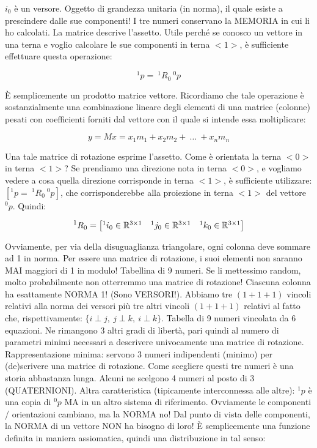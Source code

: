 $i_0$ è un versore. Oggetto di grandezza unitaria (in norma), il quale esiste a prescindere dalle sue componenti! I tre numeri conservano la MEMORIA in cui li ho calcolati. La matrice descrive l'assetto. Utile perché se conosco un vettore in una terna e voglio calcolare le sue componenti in terna $<1>$, è sufficiente effettuare questa operazione:

\[
	^1p =\ ^1R_0\ ^0p
\]

\`E semplicemente un prodotto matrice vettore. Ricordiamo che tale operazione è sostanzialmente una combinazione lineare degli elementi di una matrice (colonne) pesati con coefficienti forniti dal vettore con il quale si intende essa moltiplicare:

\[
	y = Mx = x_1m_1 + x_2m_2 +\ \dots\ + x_nm_n
\]

Una tale matrice di rotazione esprime l'assetto. Come è orientata la terna $<0>$ in terna $<1>$? Se prendiamo una direzione nota in terna $<0>$, e vogliamo vedere a cosa quella direzione corrisponde in terna $<1>$, è sufficiente utilizzare: $[^1p =\ ^1R_0\ ^0p]$, che corrisponderebbe alla proiezione in terna $<1>$ del vettore $^0p$. Quindi:

\[
	^1R_0 =
	\begin{bmatrix}{^1}i_0\in\mathbb{R}^{3\times 1}&^1j_0\in\mathbb{R}^{3\times 1}&^1k_0\in\mathbb{R}^{3\times 1}\end{bmatrix}
\]

Ovviamente, per via della disuguaglianza triangolare, ogni colonna deve sommare ad 1 in norma. Per essere una matrice di rotazione, i suoi elementi non saranno MAI maggiori di 1 in modulo! Tabellina di 9 numeri. Se li mettessimo random, molto probabilmente non otterremmo una matrice di rotazione! Ciascuna colonna ha esattamente NORMA 1! (Sono VERSORI!). Abbiamo tre $(1+1+1)$ vincoli relativi alla norma dei versori più tre altri vincoli $(1+1+1)$ relativi al fatto che, rispettivamente: $\{i\perp j,\ j\perp k,\ i\perp k\}$. Tabella di 9 numeri vincolata da 6 equazioni. Ne rimangono 3 altri gradi di libertà, pari quindi al numero di parametri minimi necessari a descrivere univocamente una matrice di rotazione. Rappresentazione minima: servono 3 numeri indipendenti (minimo) per (de)scrivere una matrice di rotazione. Come scegliere questi tre numeri è una storia abbastanza lunga. Alcuni ne scelgono 4 numeri al posto di 3 (QUATERNIONI). Altra caratteristica (tipicamente interconnessa alle altre): $^1p$ è una copia di $^0p$ MA in un altro sistema di riferimento. Ovviamente le componenti / orientazioni cambiano, ma la NORMA no! Dal punto di vista delle componenti, la NORMA di un vettore NON ha bisogno di loro! \`E semplicemente una funzione definita in maniera assiomatica, quindi una distribuzione in tal senso:

